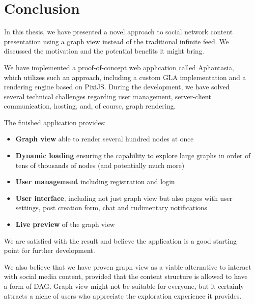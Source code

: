 \chapter{Conclusion}

In this thesis, we have presented a novel approach to social network content presentation using a graph view
instead of the traditional infinite feed.
We discussed the motivation and the potential benefits it might bring.

We have implemented a proof-of-concept web application called Aphantasia, which utilizes such an approach, including 
a custom \gls{GLA} implementation and a rendering engine based on PixiJS.
During the development, we have solved several technical challenges regarding user management,
server-client communication, hosting, and, of course, graph rendering.

The finished application provides:
\begin{itemize}
    \item \textbf{Graph view} able to render several hundred nodes at once
    \item \textbf{Dynamic loading} ensuring the capability to explore large graphs in order of tens of thousands of nodes (and potentially much more)
    \item \textbf{User management} including registration and login
    \item \textbf{User interface}, including not just graph view but also pages with user settings, post creation form, chat
 and rudimentary notifications
   \item \textbf{Live preview} of the graph view
\end{itemize}

We are satisfied with the result and believe the application is a good starting point for further development.

We also believe that we have proven graph view as a viable alternative to interact with social media content,
provided that the content structure is allowed to have a form of \gls{DAG}.
Graph view might not be suitable for everyone, but it certainly attracts a niche of users who appreciate the exploration experience it provides.